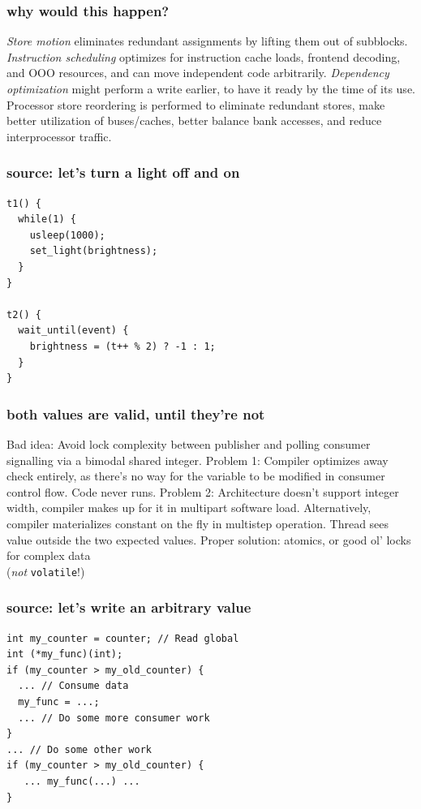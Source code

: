 \documentclass{beamer}
\begin{document}
\begin{frame}
\frametitle{why would this happen?}
\textit{Store motion} eliminates redundant assignments by lifting them
out of subblocks. \textit{Instruction scheduling} optimizes for instruction
cache loads, frontend decoding, and OOO resources, and can move independent
code arbitrarily. \textit{Dependency optimization} might perform a write
earlier, to have it ready by the time of its use.
\vfill
Processor store reordering is performed to eliminate redundant stores,
make better utilization of buses/caches, better balance bank accesses,
and reduce interprocessor traffic.
\end{frame}

\begin{frame}[fragile]
\frametitle{source: let's turn a light off and on}
\begin{lstlisting}
t1() {
  while(1) {
    usleep(1000);
    set_light(brightness);
  }
}

t2() {
  wait_until(event) {
    brightness = (t++ % 2) ? -1 : 1;
  }
}
\end{lstlisting}
\end{frame}

\begin{frame}
\frametitle{both values are valid, until they're not}
Bad idea: Avoid lock complexity between publisher and polling consumer signalling via a bimodal shared integer.
\vfill
Problem 1: Compiler optimizes away check entirely, as there's no way for the variable to be modified in consumer control flow. Code never runs.
\vfill
Problem 2: Architecture doesn't support integer width, compiler makes up for it in multipart software load. Alternatively, compiler materializes constant on the fly in multistep operation. Thread sees value outside the two expected values.
\vfill
Proper solution: atomics, or good ol' locks for complex data\\
  (\textit{not} \texttt{volatile}!)
\end{frame}

\begin{frame}[fragile]
\frametitle{source: let's write an arbitrary value}
\begin{lstlisting}
int my_counter = counter; // Read global
int (*my_func)(int);
if (my_counter > my_old_counter) {
  ... // Consume data
  my_func = ...;
  ... // Do some more consumer work
}
... // Do some other work
if (my_counter > my_old_counter) {
   ... my_func(...) ...
}
\end{lstlisting}
\end{frame}
\end{document}
